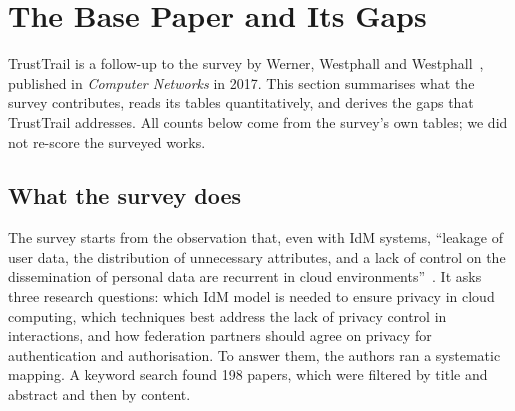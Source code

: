 \section{The Base Paper and Its Gaps}
\label{sec:basepaper}

TrustTrail is a follow-up to the survey by Werner, Westphall and Westphall~\cite{werner2017survey}, published in \emph{Computer Networks} in 2017. This section summarises what the survey contributes, reads its tables quantitatively, and derives the gaps that TrustTrail addresses. All counts below come from the survey's own tables; we did not re-score the surveyed works.

\subsection{What the survey does}
The survey starts from the observation that, even with IdM systems, ``leakage of user data, the distribution of unnecessary attributes, and a lack of control on the dissemination of personal data are recurrent in cloud environments''~\cite{werner2017survey}. It asks three research questions: which IdM model is needed to ensure privacy in cloud computing, which techniques best address the lack of privacy control in interactions, and how federation partners should agree on privacy for authentication and authorisation. To answer them, the authors ran a systematic mapping. A keyword search found 198 papers, which were filtered by title and abstract and then by content.

